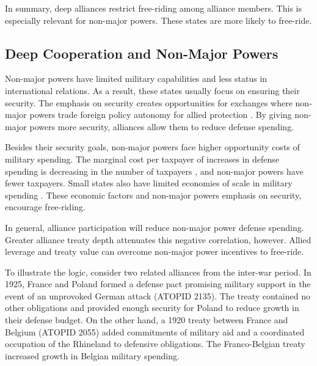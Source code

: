\documentclass[12pt]{article}
\begin{document}
In summary, deep alliances restrict free-riding among alliance members. 
This is especially relevant for non-major powers.
These states are more likely to free-ride. 


\subsection{Deep Cooperation and Non-Major Powers} 


Non-major powers have limited military capabilities and less status in international relations. 
As a result, these states usually focus on ensuring their security.  
The emphasis on security creates opportunities for exchanges where non-major powers trade foreign policy autonomy for allied protection \citep{Altfield1984, Morrow1991}. 
By giving non-major powers more security, alliances allow them to reduce defense spending. 


Besides their security goals, non-major powers face higher opportunity costs of military spending. 
The marginal cost per taxpayer of increases in defense spending is decreasing in the number of taxpayers \citep{DudleyMontmarquette1981}, and non-major powers have fewer taxpayers. 
Small states also have limited economies of scale in military spending \citep{Moravcsik1991, Kapstein1991, Anderton1995, Devore2013}.
These economic factors and non-major powers emphasis on security, encourage free-riding.  


In general, alliance participation will reduce non-major power defense spending. 
Greater alliance treaty depth attenuates this negative correlation, however. 
Allied leverage and treaty value can overcome non-major power incentives to free-ride. 


To illustrate the logic, consider two related alliances from the inter-war period. 
In 1925, France and Poland formed a defense pact promising military support in the event of an unprovoked German attack (ATOPID 2135). 
The treaty contained no other obligations and provided enough security for Poland to reduce growth in their defense budget.
On the other hand, a 1920 treaty between France and Belgium (ATOPID 2055) added commitments of military aid and a coordinated occupation of the Rhineland to defensive obligations. 
The Franco-Belgian treaty increased growth in Belgian military spending. 
 
\end{document}
